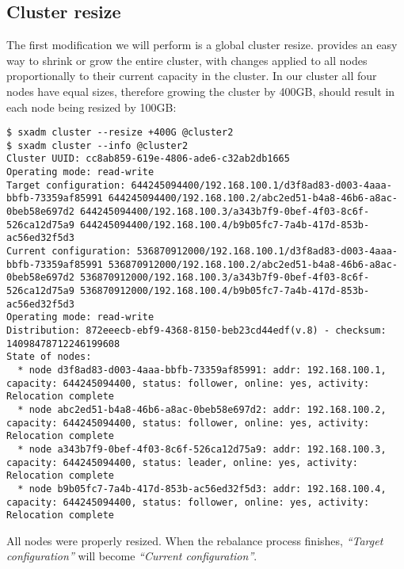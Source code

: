 \subsection{Cluster resize}
The first modification we will perform is a global cluster resize.
 provides an easy way to shrink or grow
the entire cluster, with changes applied to all nodes proportionally to
their current capacity in the cluster. In our cluster all four nodes
have equal sizes, therefore growing the cluster by 400GB, should result
in each node being resized by 100GB:
\begin{lstlisting}
$ sxadm cluster --resize +400G @cluster2
$ sxadm cluster --info @cluster2
Cluster UUID: cc8ab859-619e-4806-ade6-c32ab2db1665
Operating mode: read-write
Target configuration: 644245094400/192.168.100.1/d3f8ad83-d003-4aaa-bbfb-73359af85991 644245094400/192.168.100.2/abc2ed51-b4a8-46b6-a8ac-0beb58e697d2 644245094400/192.168.100.3/a343b7f9-0bef-4f03-8c6f-526ca12d75a9 644245094400/192.168.100.4/b9b05fc7-7a4b-417d-853b-ac56ed32f5d3 
Current configuration: 536870912000/192.168.100.1/d3f8ad83-d003-4aaa-bbfb-73359af85991 536870912000/192.168.100.2/abc2ed51-b4a8-46b6-a8ac-0beb58e697d2 536870912000/192.168.100.3/a343b7f9-0bef-4f03-8c6f-526ca12d75a9 536870912000/192.168.100.4/b9b05fc7-7a4b-417d-853b-ac56ed32f5d3
Operating mode: read-write
Distribution: 872eeecb-ebf9-4368-8150-beb23cd44edf(v.8) - checksum: 14098478712246199608
State of nodes:
  * node d3f8ad83-d003-4aaa-bbfb-73359af85991: addr: 192.168.100.1, capacity: 644245094400, status: follower, online: yes, activity: Relocation complete
  * node abc2ed51-b4a8-46b6-a8ac-0beb58e697d2: addr: 192.168.100.2, capacity: 644245094400, status: follower, online: yes, activity: Relocation complete
  * node a343b7f9-0bef-4f03-8c6f-526ca12d75a9: addr: 192.168.100.3, capacity: 644245094400, status: leader, online: yes, activity: Relocation complete
  * node b9b05fc7-7a4b-417d-853b-ac56ed32f5d3: addr: 192.168.100.4, capacity: 644245094400, status: follower, online: yes, activity: Relocation complete
\end{lstlisting}
All nodes were properly resized. When the rebalance process finishes, \emph{``Target
configuration''} will become \emph{``Current configuration''}.

